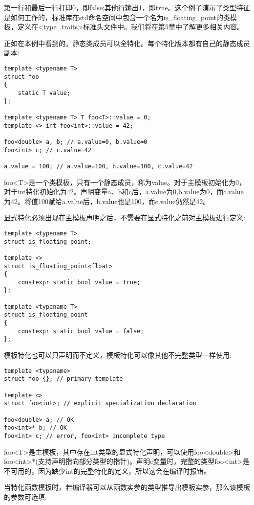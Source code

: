 第一行和最后一行打印0，即false;其他行输出1，即true。这个例子演示了类型特征是如何工作的，标准库在std命名空间中包含一个名为is\_floating\_point的类模板，定义在<type\_traits>标准头文件中。我们将在第5章中了解更多相关内容。

正如在本例中看到的，静态类成员可以全特化。每个特化版本都有自己的静态成员副本:

\begin{lstlisting}[style=styleCXX]
template <typename T>
struct foo
{
	static T value;
};

template <typename T> T foo<T>::value = 0;
template <> int foo<int>::value = 42;

foo<double> a, b; // a.value=0, b.value=0
foo<int> c; // c.value=42

a.value = 100; // a.value=100, b.value=100, c.value=42
\end{lstlisting}

foo<T>是一个类模板，只有一个静态成员，称为value。对于主模板初始化为0，对于int特化初始化为42。声明变量a、b和c后，a.value为0,b.value为0，而c.value为42。将值100赋给a.value后，b.value也是100，而c.value仍然是42。

显式特化必须出现在主模板声明之后，不需要在显式特化之前对主模板进行定义:

\begin{lstlisting}[style=styleCXX]
template <typename T>
struct is_floating_point;

template <>
struct is_floating_point<float>
{
	constexpr static bool value = true;
};

template <typename T>
struct is_floating_point
{
	constexpr static bool value = false;
};
\end{lstlisting}

模板特化也可以只声明而不定义，模板特化可以像其他不完整类型一样使用:

\begin{lstlisting}[style=styleCXX]
template <typename>
struct foo {}; // primary template

template <>
struct foo<int>; // explicit specialization declaration

foo<double> a; // OK
foo<int>* b; // OK
foo<int> c; // error, foo<int> incomplete type
\end{lstlisting}

foo<T>是主模板，其中存在int类型的显式特化声明，可以使用foo<double>和foo<int>*(支持声明指向部分类型的指针)。声明c变量时，完整的类型foo<int>是不可用的，因为缺少int的完整特化的定义，所以这会在编译时报错。

当特化函数模板时，若编译器可以从函数实参的类型推导出模板实参，那么该模板的参数可选填:

